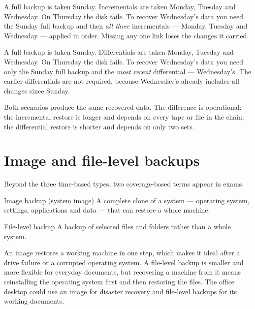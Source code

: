 \begin{example}
A full backup is taken Sunday. Incrementals are taken Monday, Tuesday and
Wednesday. On Thursday the disk fails. To recover Wednesday's data you need
the Sunday full backup and then \emph{all three} incrementals --- Monday,
Tuesday and Wednesday --- applied in order. Missing any one link loses the
changes it carried.
\end{example}

\begin{example}
A full backup is taken Sunday. Differentials are taken Monday, Tuesday and
Wednesday. On Thursday the disk fails. To recover Wednesday's data you need
only the Sunday full backup and the \emph{most recent} differential ---
Wednesday's. The earlier differentials are not required, because Wednesday's
already includes all changes since Sunday.
\end{example}

Both scenarios produce the same recovered data. The difference is operational:
the incremental restore is longer and depends on every tape or file in the
chain; the differential restore is shorter and depends on only two sets.

\section{Image and file-level backups}
Beyond the three time-based types, two coverage-based terms appear in exams.

\begin{definitionbox}{Image backup (system image)}
A complete clone of a system --- operating system, settings, applications and
data --- that can restore a whole machine.
\end{definitionbox}

\begin{definitionbox}{File-level backup}
A backup of selected files and folders rather than a whole system.
\end{definitionbox}

An image restores a working machine in one step, which makes it ideal after a
drive failure or a corrupted operating system. A file-level backup is smaller
and more flexible for everyday documents, but recovering a machine from it
means reinstalling the operating system first and then restoring the files.
The office desktop could use an image for disaster recovery and file-level
backups for its working documents.

